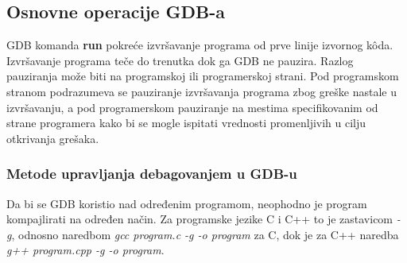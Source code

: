 \documentclass[a4paper]{article}
\begin{document}
\subsection{Osnovne operacije GDB-a}
\label{subsec:debager_operacije}

GDB komanda \textbf{run} pokreće izvršavanje programa od prve linije izvornog k\^{o}da.
Izvršavanje programa teče do trenutka dok ga GDB ne pauzira. 
Razlog pauziranja može biti na programskoj ili programerskoj strani.
Pod programskom stranom podrazumeva se pauziranje
izvršavanja programa zbog greške nastale u izvršavanju, a pod programerskom
pauziranje na mestima specifikovanim od strane programera kako bi se mogle ispitati
vrednosti promenljivih u cilju otkrivanja grešaka.

\subsubsection{Metode upravljanja debagovanjem u GDB-u}
\label{subsec:gdb_metode}

Da bi se GDB koristio nad određenim programom, neophodno je program kompajlirati 
na određen način. Za programske jezike C i C++ to je zastavicom \textit{-g}, odnosno naredbom
\textit{gcc program.c -g -o program} za C, dok je za C++ naredba \textit{g++ program.cpp -g -o program}.
\end{document}
